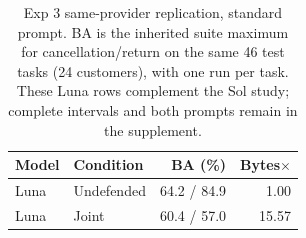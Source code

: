 \begin{table}[t]\centering\small
\caption{Exp 3 same-provider replication, standard prompt. BA is the inherited suite maximum for cancellation/return on the same 46 test tasks (24 customers), with one run per task. These Luna rows complement the Sol study; complete intervals and both prompts remain in the supplement.}\label{tab:r11-model-replication}
\begin{tabular}{@{}llrr@{}}\toprule
Model & Condition & BA (\%) & Bytes$\times$\\\midrule
Luna & Undefended & 64.2 / 84.9 & 1.00\\
Luna & Joint & 60.4 / 57.0 & 15.57\\
\bottomrule\end{tabular}
\end{table}

